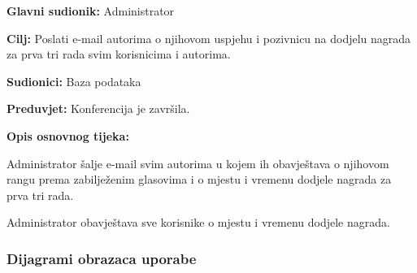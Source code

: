 					\noindent {}
					\begin{packed_item}
						
						\item \textbf{Glavni sudionik: }Administrator
						\item  \textbf{Cilj:} Poslati e-mail autorima o njihovom uspjehu i pozivnicu na dodjelu nagrada za prva tri rada svim korisnicima i autorima.
						\item  \textbf{Sudionici:} Baza podataka
						\item  \textbf{Preduvjet:} Konferencija je završila.
						\item  \textbf{Opis osnovnog tijeka:}
						
						\item[] \begin{packed_enum}
							
							\item Administrator šalje e-mail svim autorima u kojem ih obavještava o njihovom rangu prema zabilježenim glasovima i o mjestu i vremenu dodjele nagrada za prva tri rada.
							\item Administrator obavještava sve korisnike o mjestu i vremenu dodjele nagrada.
						\end{packed_enum}
						
					\end{packed_item}
					
					
				\subsubsection{Dijagrami obrazaca uporabe}
					
					
